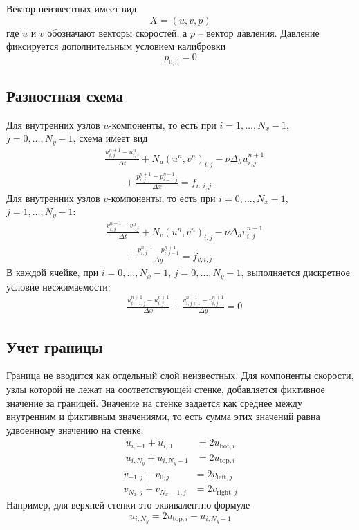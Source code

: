 \documentclass[12pt,a4paper]{article}
\newcommand{\dx}{\Delta x}
\newcommand{\dy}{\Delta y}
\newcommand{\dt}{\Delta t}
\begin{document}
Вектор неизвестных имеет вид
\[
    X=(u,v,p)
\]
где \(u\) и \(v\) обозначают векторы скоростей, а \(p\) --
вектор давления. Давление фиксируется дополнительным условием
калибровки
\[
    p_{0,0}=0
\]

\subsection{Разностная схема}

Для внутренних узлов \(u\)-компоненты, то есть при
\(i=1,\dots,N_x-1\), \(j=0,\dots,N_y-1\), схема имеет вид
\[
    \begin{aligned}
    &\frac{u^{n+1}_{i,j}-u^n_{i,j}}{\dt}
    + N_u(u^n,v^n)_{i,j}
    - \nu \Delta_h u^{n+1}_{i,j} \\
    &\qquad
    + \frac{p^{n+1}_{i,j}-p^{n+1}_{i-1,j}}{\dx}
    = f_{u,i,j}
    \end{aligned}
\]
Для внутренних узлов \(v\)-компоненты, то есть при
\(i=0,\dots,N_x-1\), \(j=1,\dots,N_y-1\):
\[
    \begin{aligned}
    &\frac{v^{n+1}_{i,j}-v^n_{i,j}}{\dt}
    + N_v(u^n,v^n)_{i,j}
    - \nu \Delta_h v^{n+1}_{i,j} \\
    &\qquad
    + \frac{p^{n+1}_{i,j}-p^{n+1}_{i,j-1}}{\dy}
    = f_{v,i,j}
    \end{aligned}
\]
В каждой ячейке, при \(i=0,\dots,N_x-1\), \(j=0,\dots,N_y-1\),
выполняется дискретное условие несжимаемости:
\[
    \begin{aligned}
    &\frac{u^{n+1}_{i+1,j}-u^{n+1}_{i,j}}{\dx}
    +
    \frac{v^{n+1}_{i,j+1}-v^{n+1}_{i,j}}{\dy}
    =0
    \end{aligned}
\]

\subsection{Учет границы}

Граница не вводится как отдельный слой неизвестных. Для компоненты скорости,
узлы которой не лежат на соответствующей стенке, добавляется фиктивное
значение за границей. Значение на стенке задается как среднее между внутренним
и фиктивным значениями, то есть сумма этих значений равна удвоенному значению
на стенке:
\[
    \begin{aligned}
    u_{i,-1}+u_{i,0}&=2u_{\mathrm{bot},i}\\
    u_{i,N_y}+u_{i,N_y-1}&=2u_{\mathrm{top},i}
    \end{aligned}
\]
\[
    \begin{aligned}
    v_{-1,j}+v_{0,j}&=2v_{\mathrm{left},j}\\
    v_{N_x,j}+v_{N_x-1,j}&=2v_{\mathrm{right},j}
    \end{aligned}
\]
Например, для верхней стенки это эквивалентно формуле
\[
    u_{i,N_y}=2u_{\mathrm{top},i}-u_{i,N_y-1}
\]
\end{document}
